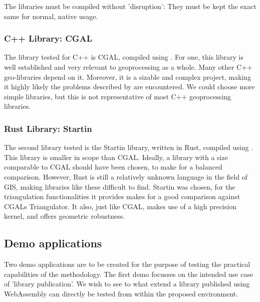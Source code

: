 The libraries must be compiled without 'disruption': They must be kept the exact same for normal, native usage. 


\subsubsection{C++ Library: CGAL} 
The library tested for C++ is CGAL, compiled using . 
For one, this library is well established and very relevant to geoprocessing as a whole. 
Many other C++ geo-libraries depend on it.
Moreover, it is a sizable and complex project, making it highly likely the problems described by  are encountered. 
We could choose more simple libraries, but this is not representative of most C++ geoprocessing libraries. 

\subsubsection{Rust Library: Startin}
The second library tested is the Startin library, written in Rust, compiled using .  
This library is smaller in scope than CGAL. 
Ideally, a library with a size comparable to CGAL should have been chosen, to make for a balanced comparison. 
However, Rust is still a relatively unknown language in the field of GIS, making libraries like these difficult to find. 
Startin was chosen, for the triangulation functionalities it provides makes for a good comparison against CGALs Triangulator. 
It also, just like CGAL, makes use of a high precision kernel, and offers geometric robustness. 

\subsection{Demo applications}

Two demo applications are to be created for the purpose of testing the practical capabilities of the methodology. 
The first demo focusses on the intended use case of 'library publication'. 
We wish to see to what extend a library published using WebAssembly can directly be tested from within the proposed environment. 

